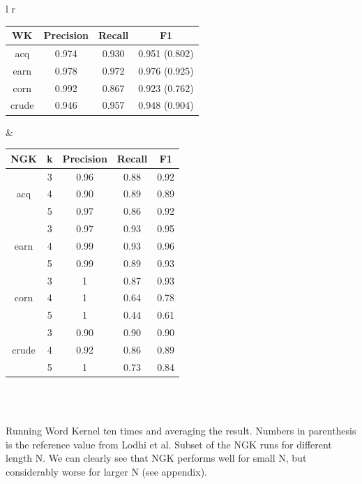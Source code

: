 
\begin{tabular}{l r}

			\begin{tabular}{| c | c | c | c | } \hline
		WK  & Precision & Recall & F1   \\ \hline	
		acq &  0.974  & 0.930  & 0.951 (0.802) \\ \hline
		earn &   0.978 & 0.972 & 0.976 (0.925)  \\ \hline
		corn &   0.992  & 0.867  &  0.923 (0.762) \\ \hline
		crude &   0.946  & 0.957  &  0.948 (0.904) \\ \hline	
	\end{tabular}
&
			\begin{tabular}{| c | c | c | c | c | }\hline
			NGK & k & Precision & Recall & F1   \\ \hline	
			& 3 & 0.96 & 0.88 & 0.92     \\ 
			acq & 4 & 0.90 & 0.89 &  0.89    \\
			& 5 & 0.97 & 0.86 & 0.92     \\ \hline
			& 3 & 0.97 & 0.93 &  0.95    \\ 
			earn & 4 & 0.99 & 0.93 &  0.96    \\ 
			& 5 & 0.99 & 0.89 &  0.93    \\ \hline
			& 3 & 1 & 0.87 & 0.93     \\ 
			corn & 4 & 1 & 0.64 & 0.78     \\ 
			& 5 & 1 & 0.44 &  0.61    \\ \hline
			& 3 & 0.90 & 0.90 &  0.90    \\ 
			crude & 4 & 0.92 & 0.86 & 0.89     \\ 
			& 5 & 1 & 0.73 &  0.84    \\ \hline
	\end{tabular}\\

\end{tabular}\\
	Running Word Kernel ten times and averaging the result. Numbers in parenthesis is the reference value from Lodhi et al.
Subset of the NGK runs for different length N. We can clearly see that NGK performs well for small N, but considerably worse for larger N (see appendix).\\
